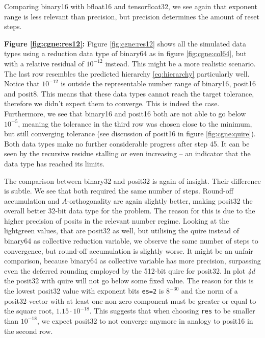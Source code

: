 \documentclass{article}
\theoremstyle{plain} %
\theoremstyle{convention} %
\theoremstyle{remark} %
\def\code#1{\texttt{#1}}
\numberwithin{equation}{section}
\begin{document}
Comparing \gls{binary16} with \gls{bfloat16} and \gls{tensorfloat32}, we see again that exponent range is less relevant than precision, but precision determines the amount of reset steps.

\textbf{Figure \ref{fig:cgne:res12}:} Figure \ref{fig:cgne:res12} shows all the simulated data types using a reduction data type of \gls{binary64} as in figure \ref{fig:cgne:col64}, but with a relative residual of $10^{-12}$ instead. This might be a more realistic scenario. The last row resembles the predicted hierarchy \eqref{eq:hierarchy} particularly well. Notice that $10^{-12}$ is outside the representable number range of \gls{binary16}, \gls{posit16} and \gls{posit8}. This means that these data types cannot reach the target tolerance, therefore we didn't expect them to converge. This is indeed the case. Furthermore, we see that \gls{binary16} and \gls{posit16} both are not able to go below $10^{-5}$, meaning the tolerance in the third row was chosen close to the minimum, but still converging tolerance (see discussion of \gls{posit16} in figure \ref{fig:cgne:quire}). Both data types make no further considerable progress after step \num{45}. It can be seen by the recursive residue stalling or even increasing -- an indicator that the data type has reached its limits.

The comparison between \gls{binary32} and \gls{posit32} is again of insight. Their difference is subtle. We see that both required the same number of steps. Round-off accumulation and $A$-orthogonality are again slightly better, making \gls{posit32} the overall better \num{32}-bit data type for the problem. The reason for this is due to the higher precision of posits in the relevant number regime. Looking at the \textcolor{clightgreen}{lightgreen} values, that are \gls{posit32} as well, but utilising the \gls{quire} instead of \gls{binary64} as collective reduction variable, we observe the same number of steps to convergence, but round-off accumulation is slightly worse. It might be an unfair comparison, because \gls{binary64} as collective variable has more precision, surpassing even the deferred rounding employed by the \num{512}-bit \gls{quire} for \gls{posit32}. In plot \textit{4d} the \gls{posit32} with \gls{quire} will not go below some fixed value. The reason for this is the lowest \gls{posit32} value with exponent bits \code{es=2} is $8^{-30}$ and the norm of a \gls{posit32}-vector with at least one non-zero component must be greater or equal to the square root, $1.15 \cdot 10^{-18}$. This suggests that when choosing \code{res} to be smaller than $10^{-18}$, we expect \gls{posit32} to not converge anymore in analogy to \gls{posit16} in the second row.
\end{document}
